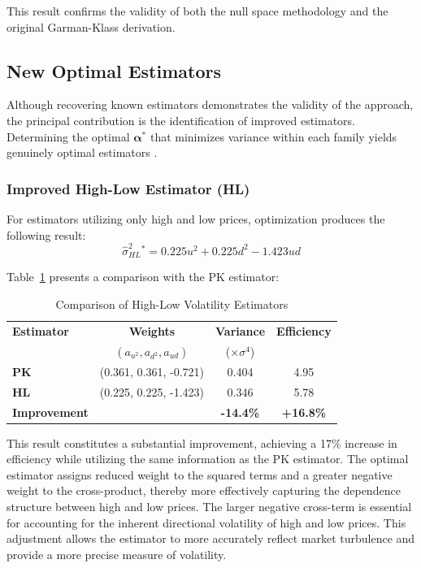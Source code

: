This result confirms the validity of both the null space methodology and the original Garman-Klass derivation.

\subsection{New Optimal Estimators}

Although recovering known estimators demonstrates the validity of the approach, the principal contribution is the identification of improved estimators. Determining the optimal $\boldsymbol{\alpha}^*$ that minimizes variance within each family yields genuinely optimal estimators \citet{shin2023AdaptiveRobustLarge}.

\subsubsection{Improved High-Low Estimator (HL)}

For estimators utilizing only high and low prices, optimization produces the following result:
\begin{equation}
\hat{\sigma}^2_{HL}^* = 0.225u^2 + 0.225d^2 - 1.423ud
\end{equation}

Table~\ref{tab:hl_comparison} presents a comparison with the PK estimator:

\begin{table}[h]
\centering
\caption{Comparison of High-Low Volatility Estimators}
\label{tab:hl_comparison}
\begin{tabular}{lccc}
\hline
\textbf{Estimator} & \textbf{Weights} & \textbf{Variance} & \textbf{Efficiency} \\
& $(a_{u^2}, a_{d^2}, a_{ud})$ & (×$\sigma^4$) & \\
\hline
\textbf{PK} & (0.361, 0.361, -0.721) & 0.404 & 4.95 \\
\textbf{HL} & (0.225, 0.225, -1.423) & 0.346 & 5.78 \\
\hline
\textbf{Improvement} & & \textbf{-14.4\%} & \textbf{+16.8\%} \\
\hline
\end{tabular}
\end{table}

This result constitutes a substantial improvement, achieving a 17\% increase in efficiency while utilizing the same information as the PK estimator. The optimal estimator assigns reduced weight to the squared terms and a greater negative weight to the cross-product, thereby more effectively capturing the dependence structure between high and low prices. The larger negative cross-term is essential for accounting for the inherent directional volatility of high and low prices. This adjustment allows the estimator to more accurately reflect market turbulence and provide a more precise measure of volatility.

